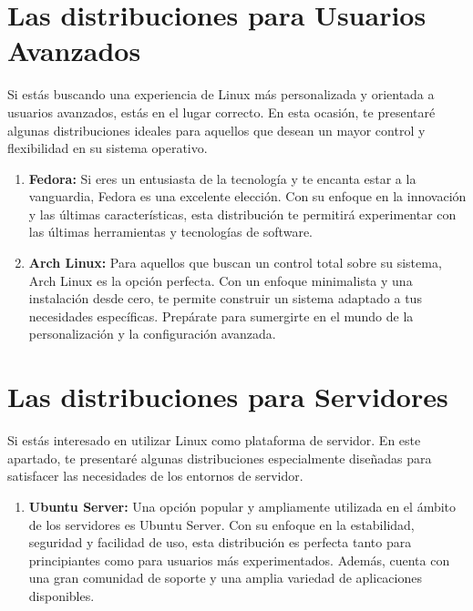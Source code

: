 \documentclass[
  jou,
  floatsintext,
  longtable,
  a4paper,
  nolmodern,
  notxfonts,
  notimes,
  12pt,
  colorlinks=true,linkcolor=blue,citecolor=blue,urlcolor=blue]{apa7}
\providecommand{\tightlist}{%
  \setlength{\itemsep}{0pt}\setlength{\parskip}{0pt}}
\begin{document}
\section{Las distribuciones para Usuarios
Avanzados}\label{las-distribuciones-para-usuarios-avanzados}

Si estás buscando una experiencia de Linux más personalizada y orientada
a usuarios avanzados, estás en el lugar correcto. En esta ocasión, te
presentaré algunas distribuciones ideales para aquellos que desean un
mayor control y flexibilidad en su sistema operativo.

\begin{enumerate}
\def\labelenumi{\arabic{enumi}.}
\item
  \textbf{Fedora:} Si eres un entusiasta de la tecnología y te encanta
  estar a la vanguardia, Fedora es una excelente elección. Con su
  enfoque en la innovación y las últimas características, esta
  distribución te permitirá experimentar con las últimas herramientas y
  tecnologías de software.
\item
  \textbf{Arch Linux:} Para aquellos que buscan un control total sobre
  su sistema, Arch Linux es la opción perfecta. Con un enfoque
  minimalista y una instalación desde cero, te permite construir un
  sistema adaptado a tus necesidades específicas. Prepárate para
  sumergirte en el mundo de la personalización y la configuración
  avanzada.
\end{enumerate}

\section{Las distribuciones para
Servidores}\label{las-distribuciones-para-servidores}

Si estás interesado en utilizar Linux como plataforma de servidor. En
este apartado, te presentaré algunas distribuciones especialmente
diseñadas para satisfacer las necesidades de los entornos de servidor.

\begin{enumerate}
\def\labelenumi{\arabic{enumi}.}
\tightlist
\item
  \textbf{Ubuntu Server:} Una opción popular y ampliamente utilizada en
  el ámbito de los servidores es Ubuntu Server. Con su enfoque en la
  estabilidad, seguridad y facilidad de uso, esta distribución es
  perfecta tanto para principiantes como para usuarios más
  experimentados. Además, cuenta con una gran comunidad de soporte y una
  amplia variedad de aplicaciones disponibles.
\end{enumerate}
\end{document}
